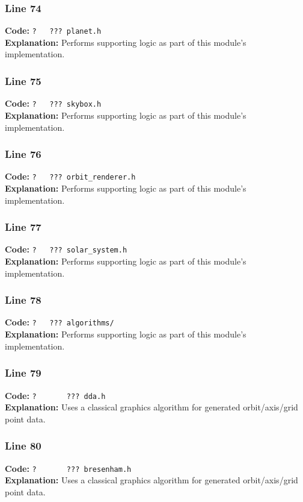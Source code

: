 \documentclass[11pt,a4paper]{article}
\begin{document}
\subsubsection*{Line 74}
\textbf{Code:} \verb|?   ??? planet.h|\\
\textbf{Explanation:} Performs supporting logic as part of this module's implementation.

\subsubsection*{Line 75}
\textbf{Code:} \verb|?   ??? skybox.h|\\
\textbf{Explanation:} Performs supporting logic as part of this module's implementation.

\subsubsection*{Line 76}
\textbf{Code:} \verb|?   ??? orbit_renderer.h|\\
\textbf{Explanation:} Performs supporting logic as part of this module's implementation.

\subsubsection*{Line 77}
\textbf{Code:} \verb|?   ??? solar_system.h|\\
\textbf{Explanation:} Performs supporting logic as part of this module's implementation.

\subsubsection*{Line 78}
\textbf{Code:} \verb|?   ??? algorithms/|\\
\textbf{Explanation:} Performs supporting logic as part of this module's implementation.

\subsubsection*{Line 79}
\textbf{Code:} \verb|?       ??? dda.h|\\
\textbf{Explanation:} Uses a classical graphics algorithm for generated orbit/axis/grid point data.

\subsubsection*{Line 80}
\textbf{Code:} \verb|?       ??? bresenham.h|\\
\textbf{Explanation:} Uses a classical graphics algorithm for generated orbit/axis/grid point data.
\end{document}
